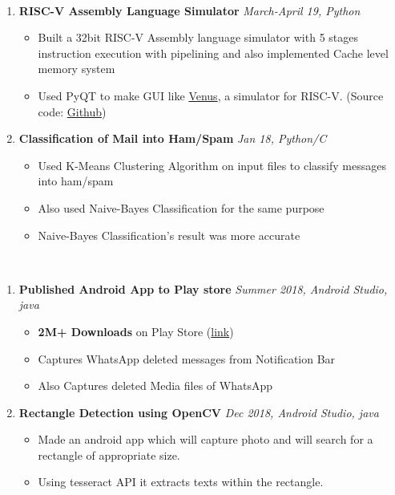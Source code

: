 \documentclass[a4paper,10pt]{awesome}
\newcommand{\psep}{-0.6cm}
\begin{document}
\\[\psep]
\begin{enumerate}
    \item \textbf{RISC-V Assembly Language Simulator}
        \hfill \emph{March-April 19, Python}\\[-0.6cm]
        \begin{itemize}
            \item Built a 32bit RISC-V Assembly language simulator with 5 stages instruction execution 
                with pipelining and also implemented Cache level memory system
            \item Used PyQT to make GUI like \href{http://www.kvakil.me/venus/}{Venus}, 
                a simulator for RISC-V. (Source code: \href{https://github.com/dilip640/RISC-V-Simulator}{Github})
        \end{itemize}
    \item \textbf{Classification of Mail into Ham/Spam}
        \hfill  \emph{ Jan 18, Python/C} \\[-0.6cm]
        \begin{itemize}
            \item Used K-Means Clustering Algorithm on input files to classify messages into ham/spam
            \item Also used Naive-Bayes Classification for the same purpose
            \item Naive-Bayes Classification's result was more accurate
        \end{itemize}
\end{enumerate}
\\[-0.5cm]
\begin{enumerate}
\item \textbf{Published Android App to Play store}
    \hfill  \emph{Summer 2018, Android Studio, java} \\[-0.6cm]
    \begin{itemize}
        \item \textbf{2M+ Downloads} on Play Store (\href{https://play.google.com/store/apps/details?id=com.extricks.whatsdeleted}{link})
        \item Captures WhatsApp deleted messages from Notification Bar
	    \item Also Captures deleted Media files of WhatsApp
    \end{itemize}
\item \textbf{Rectangle Detection using OpenCV}
    \hfill  \emph{Dec 2018, Android Studio, java} \\[-0.6cm]
    \begin{itemize}
       \item Made an android app which will capture photo and will search for a rectangle of appropriate size. 
	    \item Using tesseract API it extracts texts within the rectangle.
    \end{itemize}
\end{enumerate}
\end{document}
